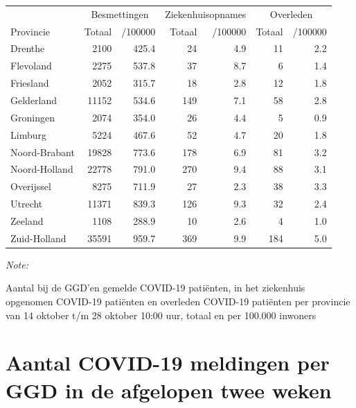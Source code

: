\documentclass[
  english,
  man,floatsintext]{apa6}
\begin{document}
\begin{table}[H]
\centering
\begin{threeparttable}
\begin{tabular}{lrrrrrr}
\toprule
\multicolumn{1}{c}{ } & \multicolumn{2}{c}{Besmettingen} & \multicolumn{2}{c}{Ziekenhuisopnames} & \multicolumn{2}{c}{Overleden} \\
\cmidrule(l{3pt}r{3pt}){2-3} \cmidrule(l{3pt}r{3pt}){4-5} \cmidrule(l{3pt}r{3pt}){6-7}
Provincie & Totaal & /100000 & Totaal & /100000 & Totaal & /100000\\
\midrule
Drenthe & 2100 & 425.4 & 24 & 4.9 & 11 & 2.2\\
Flevoland & 2275 & 537.8 & 37 & 8.7 & 6 & 1.4\\
Friesland & 2052 & 315.7 & 18 & 2.8 & 12 & 1.8\\
Gelderland & 11152 & 534.6 & 149 & 7.1 & 58 & 2.8\\
Groningen & 2074 & 354.0 & 26 & 4.4 & 5 & 0.9\\
Limburg & 5224 & 467.6 & 52 & 4.7 & 20 & 1.8\\
Noord-Brabant & 19828 & 773.6 & 178 & 6.9 & 81 & 3.2\\
Noord-Holland & 22778 & 791.0 & 270 & 9.4 & 88 & 3.1\\
Overijssel & 8275 & 711.9 & 27 & 2.3 & 38 & 3.3\\
Utrecht & 11371 & 839.3 & 126 & 9.3 & 32 & 2.4\\
Zeeland & 1108 & 288.9 & 10 & 2.6 & 4 & 1.0\\
Zuid-Holland & 35591 & 959.7 & 369 & 9.9 & 184 & 5.0\\
\bottomrule
\end{tabular}
\begin{tablenotes}
\item \textit{Note: } 
\item Aantal bij de GGD’en gemelde COVID-19 patiënten, in het ziekenhuis opgenomen COVID-19 patiënten en overleden COVID-19 patiënten per provincie van 14 oktober t/m 28 oktober 10:00 uur, totaal en per 100.000 inwoners
\end{tablenotes}
\end{threeparttable}
\end{table}

\newpage

\hypertarget{aantal-covid-19-meldingen-per-ggd-in-de-afgelopen-twee-weken}{%
\section{Aantal COVID-19 meldingen per GGD in de afgelopen twee weken}\label{aantal-covid-19-meldingen-per-ggd-in-de-afgelopen-twee-weken}}
\end{document}
